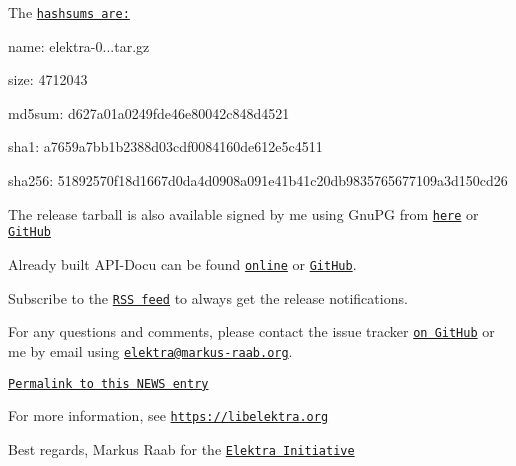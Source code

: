 The \href{https://github.com/ElektraInitiative/ftp/blob/master/releases/elektra-0.8.21.tar.gz.hashsum?raw=true}{\tt hashsums are\+:}


\begin{DoxyItemize}
\item name\+: elektra-\/0...\+tar.\+gz
\item size\+: 4712043
\item md5sum\+: d627a01a0249fde46e80042c848d4521
\item sha1\+: a7659a7bb1b2388d03cdf0084160de612e5c4511
\item sha256\+: 51892570f18d1667d0da4d0908a091e41b41c20db9835765677109a3d150cd26
\end{DoxyItemize}

The release tarball is also available signed by me using Gnu\+PG from \href{https://www.libelektra.org/ftp/elektra/releases/elektra-0.8.21.tar.gz.gpg}{\tt here} or \href{https://github.com/ElektraInitiative/ftp/blob/master/releases//elektra-0.8.21.tar.gz.gpg?raw=true}{\tt Git\+Hub}

Already built A\+P\+I-\/\+Docu can be found \href{https://doc.libelektra.org/api/0.8.21/html/}{\tt online} or \href{https://github.com/ElektraInitiative/doc/tree/master/api/0.8.21}{\tt Git\+Hub}.

Subscribe to the \href{https://www.libelektra.org/news/feed.rss}{\tt R\+SS feed} to always get the release notifications.

For any questions and comments, please contact the issue tracker \href{http://issues.libelektra.org}{\tt on Git\+Hub} or me by email using \href{mailto:elektra@markus-raab.org}{\tt elektra@markus-\/raab.\+org}.

\href{https://www.libelektra.org/news/0.8.21-release}{\tt Permalink to this N\+E\+WS entry}

For more information, see \href{https://libelektra.org}{\tt https\+://libelektra.\+org}

Best regards, Markus Raab for the \href{https://www.libelektra.org/developers/authors}{\tt Elektra Initiative} 